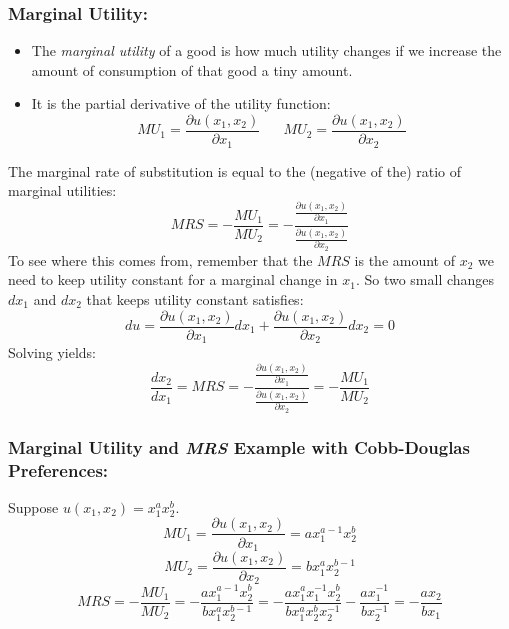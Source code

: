 \documentclass{article}
\begin{document}
\subsubsection*{Marginal Utility:}
\begin{itemize}
  \item The \emph{marginal utility} of a good is how much utility changes if we increase the amount of consumption of that good a tiny amount.
  \item It is the partial derivative of the utility function:
    \[
      MU_1 = \frac{\partial u\left( x_1,x_2 \right)}{\partial x_1} \;\;\;\;\;\;
      MU_2 = \frac{\partial u\left( x_1,x_2 \right)}{\partial x_2}
    \]
\end{itemize}
The marginal rate of substitution is equal to the (negative of the) ratio of marginal utilities:
\[
  MRS =- \frac{MU_1}{MU_2}=
    -\frac{\frac{\partial u\left( x_1,x_2\right)}{\partial x_1}}
          {\frac{\partial u\left( x_1,x_2\right)}{\partial x_2}}
\]
To see where this comes from, remember that the $MRS$ is the amount of $x_2$ we need to keep utility constant for a marginal change in $x_1$. So two small changes $dx_1$ and $dx_2$ that keeps utility constant satisfies:
\begin{equation*}
  du = \frac{\partial u\left( x_1,x_2 \right)}{\partial x_1}dx_1 +\frac{\partial u\left( x_1,x_2 \right)}{\partial x_2}dx_2  = 0
\end{equation*}
Solving yields:
\begin{equation*}
  \frac{dx_2}{dx_1}=MRS=
    -\frac{\frac{\partial u\left( x_1,x_2\right)}{\partial x_1}}
          {\frac{\partial u\left( x_1,x_2\right)}{\partial x_2}}=
  - \frac{MU_1}{MU_2}
\end{equation*}
\subsubsection*{Marginal Utility and \emph{MRS} Example with Cobb-Douglas Preferences:}
Suppose $u\left( x_1,x_2 \right)=x_1^ax_2^b$.
\begin{equation*}
  MU_1 = \frac{\partial u\left( x_1,x_2 \right)}{\partial x_1} = a x_1^{a-1}x_2^b
\end{equation*}
\begin{equation*}
  MU_2 = \frac{\partial u\left( x_1,x_2 \right)}{\partial x_2} = b x_1^{a}x_2^{b-1}
\end{equation*}
\begin{equation*}
  MRS = - \frac{MU_1}{MU_2}= - \frac{ax_1^{a-1}x_2^b}{bx_1^ax_2^{b-1}}=-\frac{a x_1^a x_1^{-1}x_2^b}{b x_1^a x_2^bx_2^{-1}}-\frac{ax_1^{-1}}{bx_2^{-1}} = -\frac{ax_2}{bx_1}
\end{equation*}
\end{document}

